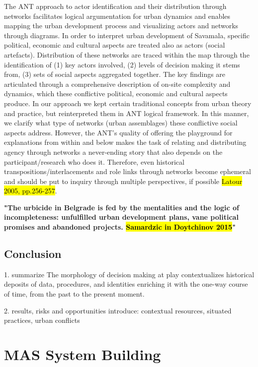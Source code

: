 \documentclass[11pt]{report}
\begin{document}
The ANT approach to actor identification and their distribution through networks facilitates logical argumentation for urban dynamics and enables mapping the urban development process and visualizing actors and networks through diagrams. In order to interpret urban development of Savamala, specific political, economic and cultural aspects are treated also as actors (social artefacts). Distribution of these networks are traced within the map through the identification of (1)  key actors involved, (2) levels of decision making it stems from, (3) sets of social aspects aggregated together. The key findings are articulated through a comprehensive description of on-site complexity and dynamics, which these conflictive political, economic and cultural aspects produce. In our approach we kept certain traditional concepts from urban theory and practice, but reinterpreted them in ANT logical framework. In this manner, we clarify what type of networks (urban assemblages) these conflictive social aspects address. However, the ANT's quality of offering the playground for explanations from within and below makes the task of relating and distributing agency through networks a never-ending story that also depends on the participant/research who does it. Therefore, even historical transpositions/interlacements and role links through networks become ephemeral and should be put to inquiry through multiple perspectives, if possible \hl{Latour 2005, pp.256-257}.

\textbf{"The  urbicide  in  Belgrade  is  fed  by  the  mentalities and  the  logic  of  incompleteness:  unfulfilled  urban development  plans,  vane  political  promises  and abandoned  projects. \hl{Samardzic in Doytchinov 2015}"}

\section{Conclusion}

1. summarize
The morphology of decision making at play contextualizes historical deposits of data, procedures, and identities enriching it with the one-way course of time, from the past to the present moment.

2. results, risks and opportunities
introduce:
contextual resources, situated practices, urban conflicts

\chapter{MAS System Building}
\end{document}
